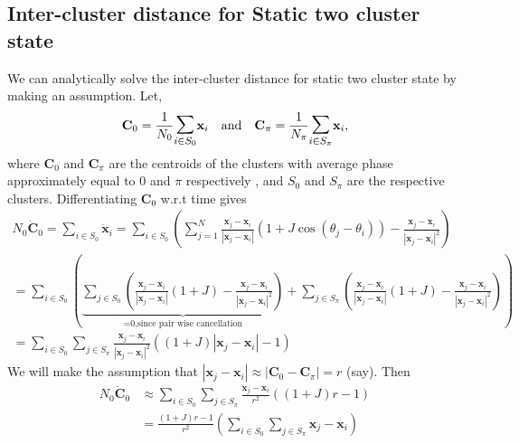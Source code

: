 \documentclass[twocolumn,10pt]{asme2ej}
\begin{document}
{    \subsection{Inter-cluster distance for Static two cluster state}
    {
        We can analytically solve the inter-cluster distance for static two cluster state by making an assumption.
        Let,
        \begin{align} %
            \mathbf{C}_0 = \frac{1}{N_0} \mathlarger{\mathlarger{\sum}}_{i \in S_0 } \mathbf{x}_i &&\text{and}&& \mathbf{C}_\pi = \frac{1}{N_\pi} \mathlarger{\mathlarger{\sum}}_{i \in S_\pi } \mathbf{x}_i ,
        \end{align}
        where \(\mathbf{C}_0\) and \(\mathbf{C}_\pi\) are the centroids of the clusters with average phase approximately equal to \(0\) and \(\pi\) respectively , and \(S_0\) and \(S_\pi\) are the respective clusters. Differentiating \(\mathbf{C}_0\) w.r.t time gives 
        \begin{multline*}
            N_0 \dot{\mathbf{C}}_0 = \sum_{i \in S_0} \dot{\mathbf{x}}_i = \sum_{i \in S_0} \left(\sum_{j=1}^N \frac{\mathbf{x}_j - \mathbf{x}_i}{|\mathbf{x}_j - \mathbf{x}_i|} \left(1 + J \cos (\theta_j - \theta_i)\right) - \frac{\mathbf{x}_j - \mathbf{x}_i}{|\mathbf{x}_j - \mathbf{x}_i|^2}\right) \\
            = \sum_{i \in S_0} \left(\underbrace{\sum_{j \in S_0} \left(\frac{\mathbf{x}_j - \mathbf{x}_i}{|\mathbf{x}_j - \mathbf{x}_i|} \left(1 + J \right) - \frac{\mathbf{x}_j - \mathbf{x}_i}{|\mathbf{x}_j - \mathbf{x}_i|^2}\right) }_{\text{=0,since pair wise cancellation}} + \sum_{j \in S_\pi} \left(\frac{\mathbf{x}_j - \mathbf{x}_i}{|\mathbf{x}_j - \mathbf{x}_i|} \left(1 + J \right) - \frac{\mathbf{x}_j - \mathbf{x}_i}{|\mathbf{x}_j - \mathbf{x}_i|^2}\right)\right) \\
            = \sum_{i \in S_0} \sum_{j \in S_\pi} \frac{\mathbf{x}_j - \mathbf{x}_i}{|\mathbf{x}_j - \mathbf{x}_i|^2} \left((1+J) |\mathbf{x}_j - \mathbf{x}_i| - 1\right)
        \end{multline*}
        We will make the assumption that \(|\mathbf{x}_j - \mathbf{x}_i| \approx |\mathbf{C}_0 - \mathbf{C}_\pi| = r\) (say). Then
        \begin{align}
            N_0 \dot{\mathbf{C}}_0 &\approx \sum_{i \in S_0} \sum_{j \in S_\pi} \frac{\mathbf{x}_j - \mathbf{x}_i}{r^2} \left((1+J) r - 1\right) \nonumber \\
            &= \frac{(1+J) r - 1}{r^2} \left(\sum_{i \in S_0} \sum_{j \in S_\pi} \mathbf{x}_j - \mathbf{x}_i\right) \nonumber\\

\end{align}}}
\end{document}
